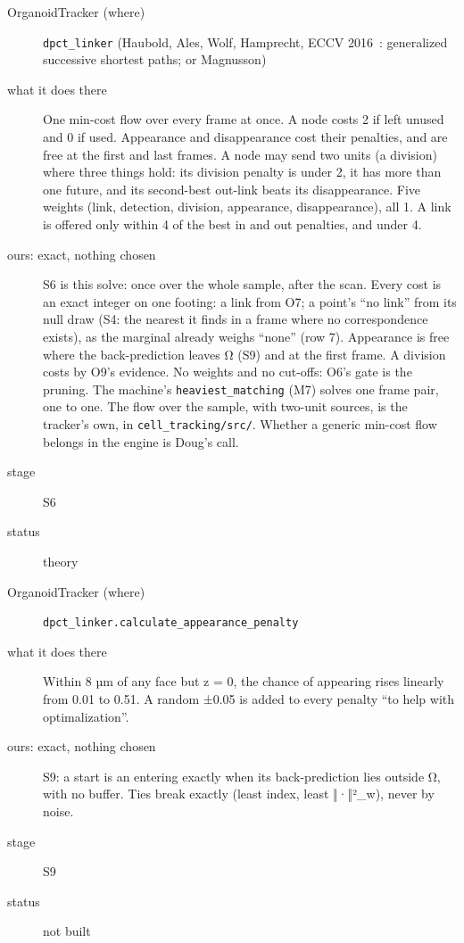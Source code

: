 \begin{description}
\item[{OrganoidTracker (where)}] \texttt{dpct\_\allowbreak{}linker} (Haubold, Ales, Wolf, Hamprecht, ECCV 2016~\cite{src:Haubold-2016}: generalized successive shortest paths; or Magnusson)
\item[{what it does there}] One min-cost flow over every frame at once. A node costs 2 if left unused and 0 if used. Appearance and disappearance cost their penalties, and are free at the first and last frames. A node may send two units (a division) where three things hold: its division penalty is under 2, it has more than one future, and its second-best out-link beats its disappearance. Five weights (link, detection, division, appearance, disappearance), all 1. A link is offered only within 4 of the best in and out penalties, and under 4.
\item[{ours: exact, nothing chosen}] S6 is this solve: once over the whole sample, after the scan. Every cost is an exact integer on one footing: a link from O7; a point's “no link” from its null draw (S4: the nearest it finds in a frame where no correspondence exists), as the marginal already weighs “none” (row 7). Appearance is free where the back-prediction leaves Ω (S9) and at the first frame. A division costs by O9's evidence. No weights and no cut-offs: O6's gate is the pruning. The machine's \texttt{heaviest\_\allowbreak{}matching} (M7) solves one frame pair, one to one. The flow over the sample, with two-unit sources, is the tracker's own, in \texttt{cell\_\allowbreak{}tracking/\allowbreak{}src/\allowbreak{}}. Whether a generic min-cost flow belongs in the engine is Doug's call.
\item[{stage}] S6
\item[{status}] theory
\end{description}

\begin{description}
\item[{OrganoidTracker (where)}] \texttt{dpct\_\allowbreak{}linker.\allowbreak{}calculate\_\allowbreak{}appearance\_\allowbreak{}penalty}
\item[{what it does there}] Within 8 µm of any face but z = 0, the chance of appearing rises linearly from 0.01 to 0.51. A random ±0.05 is added to every penalty “to help with optimalization”.
\item[{ours: exact, nothing chosen}] S9: a start is an entering exactly when its back-prediction lies outside Ω, with no buffer. Ties break exactly (least index, least ‖·‖²\_\allowbreak{}w), never by noise.
\item[{stage}] S9
\item[{status}] not built
\end{description}


